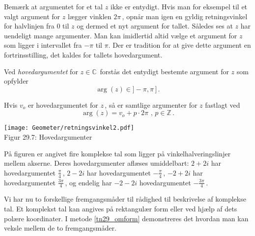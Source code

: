 Bemærk at argumentet for et tal $z$ ikke er entydigt. Hvis man for eksempel til et valgt\- argument for $z$ lægger vinklen $2\pi\,$, opnår man igen en gyldig retningsvinkel for halvlinjen fra $0$ til $z$ og dermed et nyt argument for tallet. Således ses at $z$ har uendeligt mange argumenter.\bs
Man kan imidlertid altid vælge et argument for $z$ som ligger i intervallet fra $-\pi$ til $\pi$. Der er tradition for at give dette argument en fortrinsstilling, det kaldes for tallets hovedargument.\bs
\begin{definition}[Hovedargument]
Ved \textit{hovedargumentet} for $z\in \mathbb C\,$ forstås det entydigt bestemte argument for $z$ som opfylder
$$\arg(z)\in\mathrm{]}-\pi,\pi\,\mathrm{]}\,.$$
\end{definition}
Hvis $v_o$ er hovedargumentet for $z\,$, så er samtlige argumenter for $z$ fastlagt ved 
\begin{equation}
\arg(z)=v_o+p\cdot 2\pi\,\,,\,p\in \mathbb Z\,.
\end{equation}
\begin{example}[Hovedargument]

\begin{center}
	\texttt{[image: Geometer/retningsvinkel2.pdf]}\\
Figur 29.7: Hovedargumenter
\end{center}
På figuren er angivet fire komplekse tal som ligger på vinkelhalveringslinjer mellem akserne. Deres hovedargumenter aflæses umiddelbart: $2+2i$ har hovedargumentet $\frac {\pi}4\,$, $2-2i$ har hovedargumentet $-\frac {\pi}4\,$, $-2+2i$ har hovedargumentet $\frac {3\pi}4\,$, og endelig har $-2-2i$ ho\-ved\-argumentet $-\frac {3\pi}4\,$.
\end{example}

 
Vi har nu to forskellige fremgangsmåder til rådighed
til beskrivelse af komplekse tal. Et komplekst tal kan angives på rektangulær form eller ved hjælp af dets polære koordinater. I metode \ref{tn29_omform} demonstreres det hvordan man kan veksle mellem de to fremgangsmåder. 

